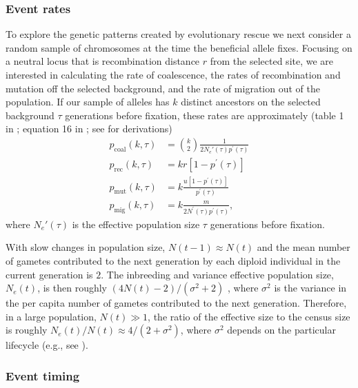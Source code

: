 \documentclass[]{article}
\begin{document}
\subsubsection*{Event rates}
\label{sec:rescue_backward}

To explore the genetic patterns created by evolutionary rescue we next consider a random sample of chromosomes at the time the beneficial allele fixes.
Focusing on a neutral locus that is recombination distance $r$ from the selected site, we are interested in calculating the rate of coalescence, the rates of recombination and mutation off the selected background, and the rate of migration out of the population.
If our sample of alleles has $k$ distinct ancestors on the selected background $\tau$ generations before fixation, these rates are approximately (table 1 in \citealp{hudson1988coalescent}; equation 16 in \citealp{pennings2006soft2}; see  for derivations)
\begin{equation}\label{eq:coal_rates}
\begin{aligned}
p_{\mathrm{coal}}(k,\tau) &= \binom{k}{2} \frac{1}{2N_e'(\tau) p^\prime(\tau)}\\
p_{\mathrm{rec}}(k,\tau) &= k r [1 - p^\prime(\tau)]\\
p_{\mathrm{mut}}(k,\tau) &= k \frac{u [1 - p^\prime(\tau)]}{p^\prime(\tau)}\\
p_{\mathrm{mig}}(k,\tau) &= k \frac{m}{2N^\prime(\tau)p^\prime(\tau)},
\end{aligned}
\end{equation} 
where $N_e'(\tau)$ is the effective population size $\tau$ generations before fixation.

With slow changes in population size, $N(t-1)\approx N(t)$ and the mean number of gametes contributed to the next generation by each diploid individual in the current generation is $2$.
The inbreeding and variance effective population size, $N_e(t)$, is then roughly $(4N(t) - 2)/(\sigma^2+2)$ \citep[equation 7.6.4.3 in][]{crow1970introduction}, where $\sigma^2$ is the variance in the per capita number of gametes contributed to the next generation.
Therefore, in a large population, $N(t)\gg1$, the ratio of the effective size to the census size is roughly $N_e(t)/N(t) \approx 4/(2+\sigma^2)$, where $\sigma^2$ depends on the particular lifecycle (e.g., see ). 

\subsubsection*{Event timing}
\end{document}
